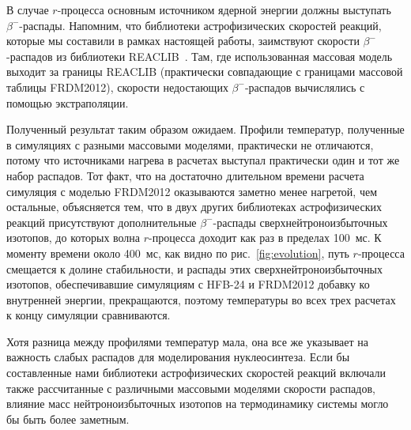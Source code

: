 В случае $r$-процесса основным источником ядерной энергии должны выступать $\beta^-$-распады. Напомним, что библиотеки астрофизических скоростей реакций, которые мы составили в рамках настоящей работы, заимствуют скорости $\beta^-$-распадов из библиотеки REACLIB~\cite{reaclib2010}. Там, где использованная массовая модель выходит за границы REACLIB (практически совпадающие с границами массовой таблицы FRDM2012), скорости недостающих $\beta^-$-распадов вычислялись с помощью экстраполяции.

Полученный результат таким образом ожидаем. Профили температур, полученные в симуляциях с разными массовыми моделями, практически не отличаются, потому что источниками нагрева в расчетах выступал практически один и тот же набор распадов. Тот факт, что на достаточно длительном времени расчета симуляция с моделью FRDM2012 оказываются заметно менее нагретой, чем остальные, объясняется тем, что в двух других библиотеках астрофизических реакций присутствуют дополнительные $\beta^-$-распады сверхнейтроноизбыточных изотопов, до которых волна $r$-процесса доходит как раз в пределах 100~мс. К моменту времени около 400~мс, как видно по рис.~\ref{fig:evolution}, путь $r$-процесса смещается к долине стабильности, и распады этих сверхнейтроноизбыточных изотопов, обеспечивавшие симуляциям с HFB-24 и FRDM2012 добавку ко внутренней энергии, прекращаются, поэтому температуры во всех трех расчетах к концу симуляции сравниваются. 

Хотя разница между профилями температур мала, она все же указывает на важность слабых распадов для моделирования нуклеосинтеза. Если бы составленные нами библиотеки астрофизических скоростей реакций включали также рассчитанные с различными массовыми моделями скорости распадов, влияние масс нейтроноизбыточных изотопов на термодинамику системы могло бы быть более заметным.
